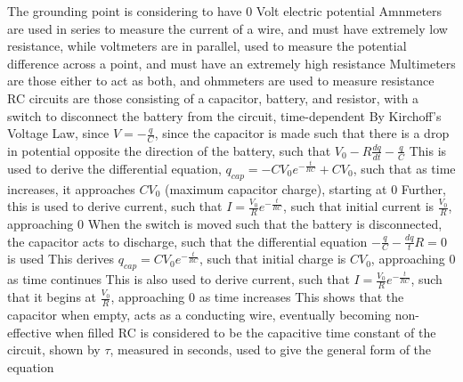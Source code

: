 \documentclass[11 pt, twoside]{article}
\newenvironment{outline*}
{
	\begin{outline}[enumerate]
	}
	{\end{outline}
}
\begin{document}
\begin{outline*}
\2 The grounding point is considering to have 0 Volt electric potential
\1 Amnmeters are used in series to measure the current of a wire, and must have extremely low resistance, while voltmeters are in parallel, used to measure the potential difference across a point, and must have an extremely high resistance
\2 Multimeters are those either to act as both, and ohmmeters are used to measure resistance
\1 RC circuits are those consisting of a capacitor, battery, and resistor, with a switch to disconnect the battery from the circuit, time-dependent
\2 By Kirchoff's Voltage Law, since $V = -\frac{q}{C}$, since the capacitor is made such that there is a drop in potential opposite the direction of the battery, such that $V_0 - R\frac{dq}{dt} - \frac{q}{C}$
\3 This is used to derive the differential equation, $q_{cap} = -CV_0e^{-\frac{t}{RC}} + CV_0$, such that as time increases, it approaches $CV_0$ (maximum capacitor charge), starting at 0
\3 Further, this is used to derive current, such that $I = \frac{V_0}{R}e^{-\frac{t}{RC}}$, such that initial current is $\frac{V_0}{R}$, approaching 0
\2 When the switch is moved such that the battery is disconnected, the capacitor acts to discharge, such that the differential equation $-\frac{q}{C} - \frac{dq}{t}R = 0$ is used
\3 This derives $q_{cap} = CV_0e^{-\frac{t}{RC}}$, such that initial charge is $CV_0$, approaching 0 as time continues
\3 This is also used to derive current, such that $I = \frac{V_0}{R}e^{-\frac{t}{RC}}$, such that it begins at $\frac{V_0}{R}$, approaching 0 as time increases
\2 This shows that the capacitor when empty, acts as a conducting wire, eventually becoming non-effective when filled
\2 RC is considered to be the capacitive time constant of the circuit, shown by $\tau$, measured in seconds, used to give the general form of the equation
\end{outline*}
\end{document}
